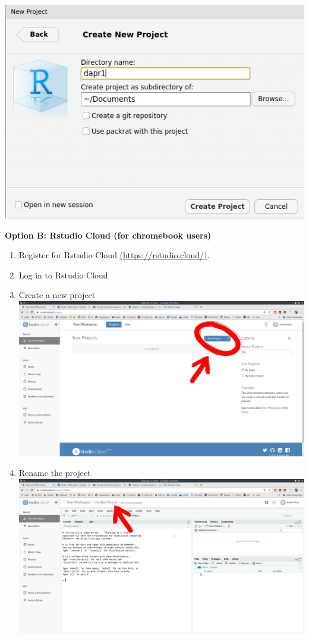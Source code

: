 \documentclass[]{book}
\providecommand{\tightlist}{%
  \setlength{\itemsep}{0pt}\setlength{\parskip}{0pt}}
\begin{document}
\begin{enumerate}
\begin{itemize}
    \includegraphics{images/installing_intro/newproj3.png}
  \end{itemize}
\end{enumerate}

\textbf{Option B: Rstudio Cloud (for chromebook users)}

\begin{enumerate}
\def\labelenumi{\arabic{enumi}.}
\tightlist
\item
  Register for Rstudio Cloud \href{https://rstudio.cloud/}{(https://rstudio.cloud/)}.
\item
  Log in to Rstudio Cloud
\item
  Create a new project
  \includegraphics{images/installing_intro/rstudiocloud.png}
\item
  Rename the project
  \includegraphics{images/installing_intro/rstudiocloud2.png}
\end{enumerate}
\end{document}
